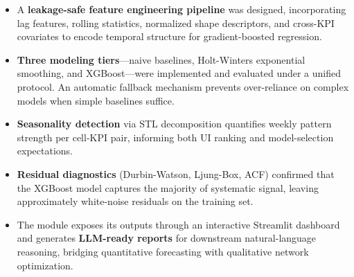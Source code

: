 \begin{itemize}
    \item A \textbf{leakage-safe feature engineering pipeline} was designed, incorporating lag features, rolling statistics, normalized shape descriptors, and cross-KPI covariates to encode temporal structure for gradient-boosted regression.

    \item \textbf{Three modeling tiers}---naive baselines, Holt-Winters exponential smoothing, and XGBoost---were implemented and evaluated under a unified protocol. An automatic fallback mechanism prevents over-reliance on complex models when simple baselines suffice.

    \item \textbf{Seasonality detection} via STL decomposition quantifies weekly pattern strength per cell-KPI pair, informing both UI ranking and model-selection expectations.

    \item \textbf{Residual diagnostics} (Durbin-Watson, Ljung-Box, ACF) confirmed that the XGBoost model captures the majority of systematic signal, leaving approximately white-noise residuals on the training set.

    \item The module exposes its outputs through an interactive Streamlit dashboard and generates \textbf{LLM-ready reports} for downstream natural-language reasoning, bridging quantitative forecasting with qualitative network optimization.
\end{itemize}
